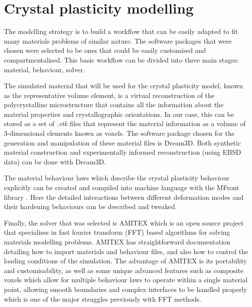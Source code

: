 \section{Crystal plasticity modelling}
The modelling strategy is to build a workflow that can be easily adapted to fit many materials problems of similar nature.
The software packages that were chosen were selected to be ones that could be easily customised and compartmentalised.
This basic workflow can be divided into three main stages: material, behaviour, solver.

The simulated material that will be used for the crystal plasticity model, known as the representative volume element, is a virtual reconstruction of the polycrystalline microstructure that contains all the information about the material properties and crystallographic orientations.
In our case, this can be stored as a set of \textit{.vtk} files that represent the material information as a volume of 3-dimensional elements known as voxels.
The software package chosen for the generation and manipulation of these material files is Dream3D.
Both synthetic material construction and experimentally informed reconstruction (using EBSD data) can be done with Dream3D.

The material behaviour laws which describe the crystal plasticity behaviour explicitly can be created and compiled into machine language with the MFront library \cite{helferIntroducingOpensourceMfront2015}.
Here the detailed interactions between different deformation modes and their hardening behaviours can be described and tweaked.

Finally, the solver that was selected is AMITEX which is an open source project that specialises in fast fourier transform (FFT) based algorithms for solving materials modelling problems.
AMITEX has straightforward documentation detailing how to import materials and behaviour files, and also how to control the loading conditions of the simulation.
The advantage of AMITEX is its portability and customisability, as well as some unique advanced features such as composite voxels which allow for multiple behaviour laws to operate within a single material point, allowing smooth boundaries and complex interfaces to be handled properly which is one of the major struggles previously with FFT methods.